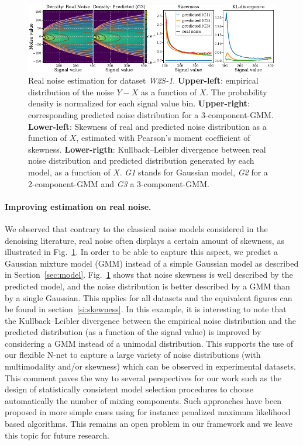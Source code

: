 \documentclass{article}
\begin{document}
\label{sec:exp:real:noise}
\begin{figure}[!htbp]
\vskip -0.1in
\begin{center}
\centerline{\includegraphics[width=\textwidth]{fig_skewness_1col_w2s-1.pdf}}
\caption{Real noise estimation for dataset \textit{W2S-1}. \textbf{Upper-left}: empirical distribution of the noise $Y - X$ as a function of $X$.
The probability density is normalized for each signal value bin.
\textbf{Upper-right}: corresponding predicted noise distribution for a 3-component-GMM.
\textbf{Lower-left}: Skewness of real and predicted noise distribution as a function of $X$, estimated with Pearson's moment coefficient of skewness.
\textbf{Lower-rigth}:  Kullback–Leibler divergence between real noise distribution and predicted distribution generated by each model, as a function of $X$.
\textit{G1} stands for Gaussian model, \textit{G2} for a 2-component-GMM and \textit{G3} a 3-component-GMM.
}
\label{fig:skewness}
\end{center}
\end{figure}
\paragraph{Improving estimation on real noise.}
We observed that contrary to the classical noise models considered in the denoising literature, real noise often displays a certain amount of skewness, as illustrated in Fig.~\ref{fig:skewness}.
In order to be able to capture this aspect, we predict a Gaussian mixture model (GMM) instead of a simple Gaussian model as described in Section~\ref{sec:model}. Fig.~\ref{fig:skewness} shows that noise skewness is well described by the predicted model, and the noise distribution is better described by a GMM than by a single Gaussian.
This applies for all datasets and the equivalent figures can be found in section~\ref{si:skewness}.
In this example, it is interesting to note that the Kullback–Leibler divergence between the empirical noise distribution and the predicted distribution (as a function of the signal value) is improved by considering a GMM instead of a unimodal distribution.
This supports the use of our flexible N-net to capture a large variety of noise distributions (with multimodality and/or skewness) which can be observed in experimental datasets.
This comment paves the way to several perspectives for our work such as the design of statistically consistent model selection procedures to choose automatically the number of mixing components.
Such approaches have been proposed in more simple cases using for instance penalized maximum likelihood based algorithms.
This remains an open problem in our framework and we leave this topic for future research.
\end{document}
